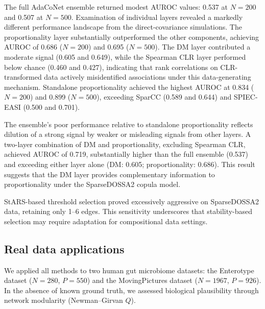 \documentclass[fleqn]{nature}
\begin{document}
The full AdaCoNet ensemble returned modest AUROC values: 0.537 at $N = 200$ and 0.507 at $N = 500$.
Examination of individual layers revealed a markedly different performance landscape from the direct-covariance simulations.
The proportionality layer substantially outperformed the other components, achieving AUROC of 0.686 ($N = 200$) and 0.695 ($N = 500$).
The DM layer contributed a moderate signal (0.605 and 0.649), while the Spearman CLR layer performed below chance (0.460 and 0.427), indicating that rank correlations on CLR-transformed data actively misidentified associations under this data-generating mechanism.
Standalone proportionality achieved the highest AUROC at 0.834 ($N = 200$) and 0.899 ($N = 500$), exceeding SparCC (0.589 and 0.644) and SPIEC-EASI (0.500 and 0.701).

The ensemble's poor performance relative to standalone proportionality reflects dilution of a strong signal by weaker or misleading signals from other layers.
A two-layer combination of DM and proportionality, excluding Spearman CLR, achieved AUROC of 0.719, substantially higher than the full ensemble (0.537) and exceeding either layer alone (DM: 0.605; proportionality: 0.686).
This result suggests that the DM layer provides complementary information to proportionality under the SparseDOSSA2 copula model.

StARS-based threshold selection proved excessively aggressive on SparseDOSSA2 data, retaining only 1--6 edges.
This sensitivity underscores that stability-based selection may require adaptation for compositional data settings.


\subsection*{Real data applications}

We applied all methods to two human gut microbiome datasets: the Enterotype dataset\cite{arumugam2011} ($N = 280$, $P = 550$) and the MovingPictures dataset\cite{caporaso2011} ($N = 1967$, $P = 926$).
In the absence of known ground truth, we assessed biological plausibility through network modularity (Newman--Girvan $Q$).
\end{document}
